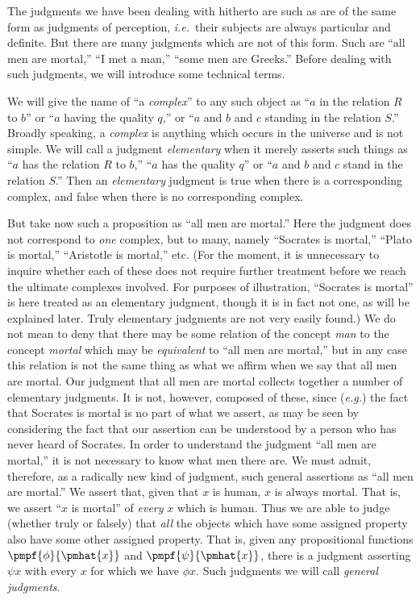 \documentclass[letterpaper,12pt,openany,leqno]{book}
\begin{document}
The judgments we have been dealing with hitherto are such as are of the same form as judgments of perception, \textit{i.e.}\ their subjects are always particular and definite. But there are many judgments which are not of this form. Such are ``all men are mortal,'' ``I met a man,'' ``some men are Greeks.'' Before dealing with such judgments, we will introduce some technical terms.

We will give the name of ``a \textit{complex}'' to any such object as ``$a$ in the relation $R$ to $b$'' or ``$a$ having the quality $q$,'' or ``$a$ and $b$ and $c$ standing in the relation $S$.'' Broadly speaking, a \textit{complex} is anything which occurs in the universe and is not simple. We will call a judgment \textit{elementary} when it merely asserts such things as ``$a$ has the relation $R$ to $b$,'' ``$a$ has the quality $q$'' or ``$a$ and $b$ and $c$ stand in the relation $S$.'' Then an \textit{elementary} judgment is true when there is a corresponding complex, and false when there is no corresponding complex.

But take now such a proposition as ``all men are mortal.'' Here the judgment does not correspond to \textit{one} complex, but to many, namely ``Socrates is mortal,'' ``Plato is mortal,'' ``Aristotle is mortal,'' etc. (For the moment, it is unnecessary to inquire whether each of these does not require further treatment before we reach the ultimate complexes involved. For purposes of illustration, ``Socrates is mortal'' is here treated as an elementary judgment, though it is in fact not one, as will be explained later. Truly elementary judgments are not very easily found.) We do not mean to deny that there may be some relation of the concept \textit{man} to the concept \textit{mortal} which may be \textit{equivalent} to ``all men are mortal,'' but in any case this relation is not the same thing as what we affirm when we say that all men are mortal. Our judgment that all men are mortal collects together a number of elementary judgments. It is not, however, composed of these, since (\textit{e.g.}) the fact that Socrates is mortal is no part of what we assert, as may be seen by considering the fact that our assertion can be understood by a person who has never heard of Socrates. In order to understand the judgment ``all men are mortal,'' it is not necessary to know what men there are. We must admit, therefore, as a radically new kind of judgment, such general assertions as ``all men are mortal.'' We assert that, given that $x$ is human, $x$ is always mortal. That is, we assert ``$x$ is mortal'' of \textit{every} $x$ which is human. Thus we are able to judge (whether truly or falsely) that \textit{all} the objects which have some assigned property also have some other assigned property. That is, given any propositional functions $\pmpf{\phi}{\pmhat{x}}$ and $\pmpf{\psi}{\pmhat{x}}$, there is a judgment asserting $\psi x$ with every $x$ for which we have $\phi x$. Such judgments we will call \textit{general judgments}.
\end{document}
